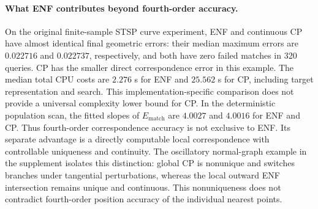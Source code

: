 \paragraph{What ENF contributes beyond fourth-order accuracy.}
On the original finite-sample STSP curve experiment, ENF and continuous CP have almost identical final geometric errors: their median maximum errors are $0.022716$ and $0.022737$, respectively, and both have zero failed matches in 320 queries. CP has the smaller direct correspondence error in this example. The median total CPU costs are $2.276$ s for ENF and $25.562$ s for CP, including target representation and search. This implementation-specific comparison does not provide a universal complexity lower bound for CP. In the deterministic population scan, the fitted slopes of $E_{\mathrm{match}}$ are $4.0027$ and $4.0016$ for ENF and CP. Thus fourth-order correspondence accuracy is not exclusive to ENF. Its separate advantage is a directly computable local correspondence with controllable uniqueness and continuity. The oscillatory normal-graph example in the supplement isolates this distinction: global CP is nonunique and switches branches under tangential perturbations, whereas the local outward ENF intersection remains unique and continuous. This nonuniqueness does not contradict fourth-order position accuracy of the individual nearest points.
